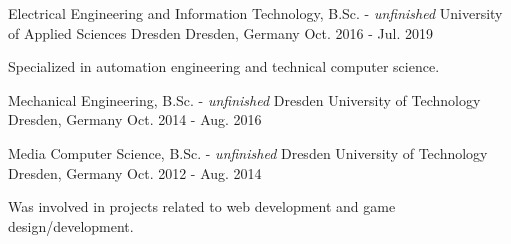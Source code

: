 

\begin{cventries}

\cventry
    {Electrical Engineering and Information Technology, B.Sc. - \emph{unfinished}}
    {University of Applied Sciences Dresden}
    {Dresden, Germany}
    {Oct. 2016 - Jul. 2019}
    {
    	\begin{cvitems}
    		\item {Specialized in automation engineering and technical computer science.}
    	\end{cvitems}
    }
    
\cventry
	{Mechanical Engineering, B.Sc. - \emph{unfinished}}
	{Dresden University of Technology}
	{Dresden, Germany}
	{Oct. 2014 - Aug. 2016}
	{}
	
\cventry
	{Media Computer Science, B.Sc. - \emph{unfinished}}
	{Dresden University of Technology}
	{Dresden, Germany}
	{Oct. 2012 - Aug. 2014}
	{
		\begin{cvitems}
			\item {Was involved in projects related to web development and game design/development.}
		\end{cvitems}
	}

  

\end{cventries}
